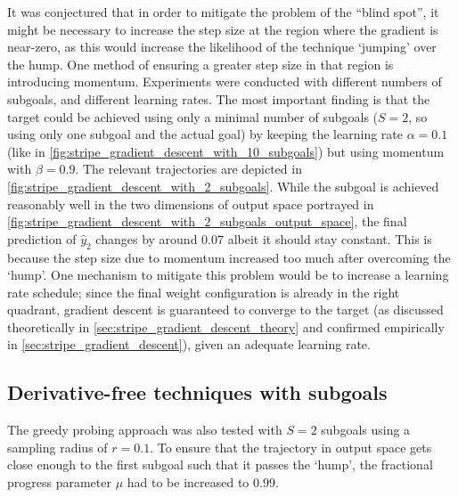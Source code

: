 It was conjectured that in order to mitigate the problem of the ``blind spot'', it might be necessary to increase the step size at the region where the gradient is near-zero, as this would increase the likelihood of the technique `jumping' over the hump.
One method of ensuring a greater step size in that region is introducing momentum.
Experiments were conducted with different numbers of subgoals, and different learning rates.
The most important finding is that the target could be achieved using only a minimal number of subgoals ($S=2$, so using only one subgoal and the actual goal) by keeping the learning rate $\alpha=0.1$ (like in \ref{fig:stripe_gradient_descent_with_10_subgoals}) but using momentum with $\beta=0.9$.
The relevant trajectories are depicted in \ref{fig:stripe_gradient_descent_with_2_subgoals}.
While the subgoal is achieved reasonably well in the two dimensions of output space portrayed in \ref{fig:stripe_gradient_descent_with_2_subgoals_output_space}, the final prediction of $\hat{y}_2$ changes by around $0.07$ albeit it should stay constant.
This is because the step size due to momentum increased too much after overcoming the `hump'.
One mechanism to mitigate this problem would be to increase a learning rate schedule; since the final weight configuration is already in the right quadrant, gradient descent is guaranteed to converge to the target (as discussed theoretically in \ref{sec:stripe_gradient_descent_theory} and confirmed empirically in \ref{sec:stripe_gradient_descent}), given an adequate learning rate.

\subsection{Derivative-free techniques with subgoals}
The greedy probing approach was also tested with $S=2$ subgoals using a sampling radius of $r=0.1$.
To ensure that the trajectory in output space gets close enough to the first subgoal such that it passes the `hump', the fractional progress parameter $\mu$ had to be increased to $0.99$.


